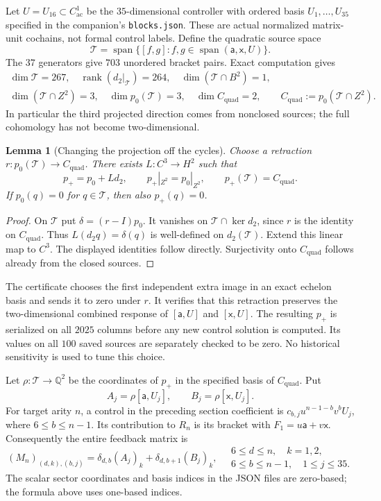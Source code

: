 \documentclass[11pt]{amsart}
\newtheorem{lemma}[theorem]{Lemma}
\newcommand{\Span}{\operatorname{span}}
\newcommand{\rank}{\operatorname{rank}}
\newcommand{\Q}{\mathbb Q}
\begin{document}
Let $U=U_{16}\subset C^1_{\mathrm{ac}}$ be the $35$-dimensional controller with
ordered basis $U_1,\ldots,U_{35}$ specified in the companion's
\texttt{blocks.json}. These are actual normalized matrix-unit cochains, not
formal control labels. Define the quadratic source space
\[
\mathcal T=\Span\{[f,g]:f,g\in\Span(\mathsf a,\mathsf x,U)\}.
\]
The $37$ generators give $703$ unordered bracket pairs. Exact computation gives
\[
\begin{gathered}
\dim\mathcal T=267,\quad \rank(d_2|_{\mathcal T})=264,\quad
\dim(\mathcal T\cap B^2)=1,\\
\dim(\mathcal T\cap Z^2)=3,\quad
\dim p_0(\mathcal T)=3,\quad
\dim C_{\mathrm{quad}}=2,
\qquad C_{\mathrm{quad}}:=p_0(\mathcal T\cap Z^2).
\end{gathered}
\]
In particular the third projected direction comes from nonclosed sources;
the full cohomology has not become two-dimensional.

\begin{lemma}[Changing the projection off the cycles]\label{lem:projection-extension}
Choose a retraction $r:p_0(\mathcal T)\to C_{\mathrm{quad}}$.
There exists $L:C^3\to H^2$ such that
\[
p_+=p_0+Ld_2,\qquad
p_+|_{Z^2}=p_0|_{Z^2},\qquad p_+(\mathcal T)=C_{\mathrm{quad}}.
\]
If $p_0(q)=0$ for $q\in\mathcal T$, then also $p_+(q)=0$.
\end{lemma}
\begin{proof}
On $\mathcal T$ put $\delta=(r-I)p_0$. It vanishes on
$\mathcal T\cap\ker d_2$, since $r$ is the identity on $C_{\mathrm{quad}}$.
Thus $L(d_2q)=\delta(q)$ is well-defined on $d_2(\mathcal T)$.
Extend this linear map to $C^3$. The displayed identities follow directly.
Surjectivity onto $C_{\mathrm{quad}}$ follows already from the closed sources.
\end{proof}

The certificate chooses the first independent extra image in an exact echelon
basis and sends it to zero under $r$. It verifies that this retraction preserves
the two-dimensional combined response of $[\mathsf a,U]$ and $[\mathsf x,U]$.
The resulting $p_+$ is serialized on all $2025$ columns before any new control
solution is computed. Its values on all $100$ saved sources are separately
checked to be zero. No historical sensitivity is used to tune this choice.

Let $\rho:\mathcal T\to\Q^2$ be the coordinates of $p_+$ in the specified basis
of $C_{\mathrm{quad}}$. Put
\[
A_j=\rho[\mathsf a,U_j],\qquad B_j=\rho[\mathsf x,U_j].
\]
For target arity $n$, a control in the preceding section coefficient is
$c_{b,j}u^{n-1-b}v^bU_j$, where $6\le b\le n-1$.
Its contribution to $R_n$ is its bracket with
$F_1=u\mathsf a+v\mathsf x$. Consequently the entire feedback matrix is
\begin{equation}\label{eq:new-feedback}
(M_n)_{(d,k),(b,j)}
=\delta_{d,b}(A_j)_k+\delta_{d,b+1}(B_j)_k,
\quad
\begin{array}{l}
6\le d\le n,\quad k=1,2,\\
6\le b\le n-1,\quad 1\le j\le35.
\end{array}
\end{equation}
The scalar sector coordinates and basis indices in the JSON files are
zero-based; the formula above uses one-based indices.
\end{document}
